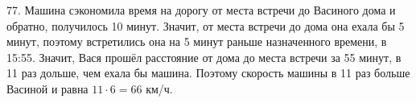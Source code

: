 77. Машина сэкономила время на дорогу от места встречи до Васиного дома и обратно, получилось 10 минут. Значит, от места встречи до дома она ехала бы 5 минут, поэтому встретились она на 5 минут раньше назначенного времени, в 15:55. Значит, Вася прошёл расстояние от дома до места встречи за 55 минут, в 11 раз дольше, чем ехала бы машина. Поэтому скорость машины в 11 раз больше Васиной и равна $11\cdot6=66$ км/ч.\\
